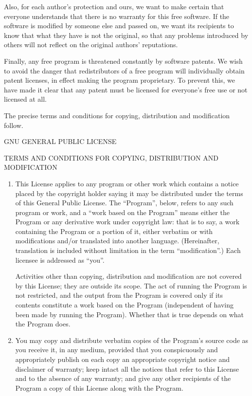 {	Also, for each author's protection and ours, we want to make certain
	that everyone understands that there is no warranty for this free
	software.  If the software is modified by someone else and passed on, we
	want its recipients to know that what they have is not the original, so
	that any problems introduced by others will not reflect on the original
	authors' reputations.
	
	Finally, any free program is threatened constantly by software
	patents.  We wish to avoid the danger that redistributors of a free
	program will individually obtain patent licenses, in effect making the
	program proprietary.  To prevent this, we have made it clear that any
	patent must be licensed for everyone's free use or not licensed at all.
	
	The precise terms and conditions for copying, distribution and
	modification follow.
	
	\begin{center}
		GNU GENERAL PUBLIC LICENSE
		
		TERMS AND CONDITIONS FOR COPYING, DISTRIBUTION AND MODIFICATION
	\end{center}
	
	\begin{enumerate}
		\item This License applies to any program or other work which contains
		a notice placed by the copyright holder saying it may be distributed
		under the terms of this General Public License.  The ``Program'', below,
		refers to any such program or work, and a ``work based on the Program''
		means either the Program or any derivative work under copyright law:
		that is to say, a work containing the Program or a portion of it,
		either verbatim or with modifications and/or translated into another
		language.  (Hereinafter, translation is included without limitation in
		the term ``modification''.)  Each licensee is addressed as ``you''.
		
		Activities other than copying, distribution and modification are not
		covered by this License; they are outside its scope.  The act of
		running the Program is not restricted, and the output from the Program
		is covered only if its contents constitute a work based on the
		Program (independent of having been made by running the Program).
		Whether that is true depends on what the Program does.
		
		\item You may copy and distribute verbatim copies of the Program's
		source code as you receive it, in any medium, provided that you
		conspicuously and appropriately publish on each copy an appropriate
		copyright notice and disclaimer of warranty; keep intact all the
		notices that refer to this License and to the absence of any warranty;
		and give any other recipients of the Program a copy of this License
		along with the Program.
		

\end{enumerate}}

